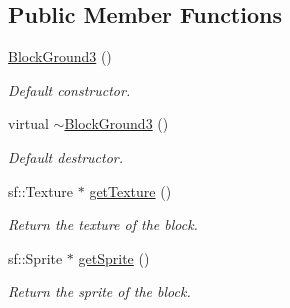 \subsection*{Public Member Functions}
\begin{DoxyCompactItemize}
\item 
\hypertarget{class_block_ground3_a9511db962f8bafe08244b67403be8c9c}{\hyperlink{class_block_ground3_a9511db962f8bafe08244b67403be8c9c}{Block\-Ground3} ()}\label{class_block_ground3_a9511db962f8bafe08244b67403be8c9c}

\begin{DoxyCompactList}\small\item\em Default constructor. \end{DoxyCompactList}\item 
\hypertarget{class_block_ground3_a35dfc1c85cb0a14e7dab32de4b26dfd8}{virtual \hyperlink{class_block_ground3_a35dfc1c85cb0a14e7dab32de4b26dfd8}{$\sim$\-Block\-Ground3} ()}\label{class_block_ground3_a35dfc1c85cb0a14e7dab32de4b26dfd8}

\begin{DoxyCompactList}\small\item\em Default destructor. \end{DoxyCompactList}\item 
sf\-::\-Texture $\ast$ \hyperlink{class_block_ground3_a356871f712e64b3f9e7efb4075509c40}{get\-Texture} ()
\begin{DoxyCompactList}\small\item\em Return the texture of the block. \end{DoxyCompactList}\item 
sf\-::\-Sprite $\ast$ \hyperlink{class_block_ground3_a55747e1cbcdae3df63da4bacd9eb7d17}{get\-Sprite} ()
\begin{DoxyCompactList}\small\item\em Return the sprite of the block. \end{DoxyCompactList}\end{DoxyCompactItemize}
